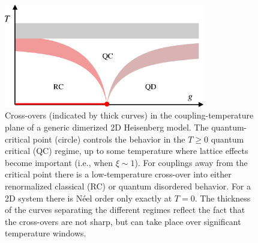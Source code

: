 \documentclass[draft,numberedheadings]{aipproc}
\begin{document}
\begin{figure}
\includegraphics[width=8.75cm, clip]{qcphases.eps}
\caption{Cross-overs (indicated by thick curves) in the coupling-temperature plane of a generic dimerized 2D Heisenberg model. The quantum-critical 
point (circle) controls the behavior in the $T\ge 0$ quantum critical (QC) regime, up to some temperature where lattice effects become important
(i.e., when $\xi \sim 1$). For couplings away from the critical point there is a low-temperature cross-over into either renormalized classical (RC) 
or quantum disordered behavior. For a 2D system there is N\'eel order only exactly at $T=0$. The thickness of the curves separating the different 
regimes reflect the fact that the cross-overs are not sharp, but can take place over significant temperature windows.}
\label{qcphases}
\end{figure}
\end{document}
